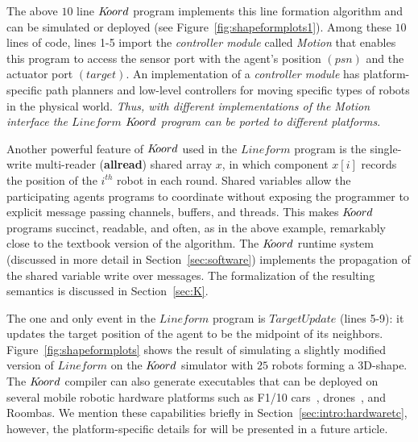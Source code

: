 The above $10$ line  $K\kern-2pt oord$ program implements this line formation algorithm and can be simulated or deployed (see Figure~\ref{fig:shapeformplots1}). Among these $10$ lines of code, lines 1-5 import the {\em controller module\/} called {\em Motion\/} that enables this program to access the sensor port with the agent's position $(\mathit{psn})$ and the actuator port $(\mathit{target})$. An implementation of  a {\em controller module\/} has platform-specific path planners and low-level controllers for moving specific types of robots in the physical world. {\em Thus, with different implementations of the {\em Motion\/} interface the $\mathit{Lineform}$ $K\kern-2pt oord$  program can be ported to different platforms\/}. 

Another powerful feature of $K\kern-2pt oord$ used in the $\mathit{Lineform}$ program is the single-write multi-reader ({\bf allread}) shared array $x$, in which component $x[i]$ records the position of the $i^{th}$ robot in each round.  Shared variables allow the participating agents programs to coordinate without exposing the programmer to explicit message passing channels, buffers, and threads. This makes $K\kern-2pt oord$ programs succinct, readable, and often, as in the  above example, remarkably close to the textbook version of the algorithm. The $K\kern-2pt oord$ runtime system (discussed in more detail in Section~\ref{sec:software}) implements the propagation of  the shared variable write over messages. The formalization of the resulting semantics is discussed in Section~\ref{sec:K}.

%
The one and only event in the $\mathit{Lineform}$ program is $\mathit{TargetUpdate}$ (lines 5-9): it updates the target position of the agent  to be the midpoint of its neighbors.  Figure~\ref{fig:shapeformplots} shows the result of simulating a slightly modified version of $\mathit{Lineform}$ on the $K\kern-2pt oord$ simulator with $25$ robots forming a 3D-shape. The $K\kern-2pt oord$ compiler can also generate executables that can be deployed on several mobile robotic hardware platforms such as F1/10 cars~\cite{f1-10}, drones~\cite{}, and Roombas. We mention these capabilities briefly in Section~\ref{sec:intro:hardwaretc}, however, the platform-specific details for will be presented in a future article. 

 

